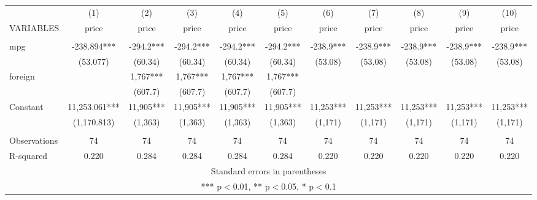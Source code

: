 \documentclass[]{article}
\begin{document}
\begin{tabular}{lcccccccccc} \hline
 & (1) & (2) & (3) & (4) & (5) & (6) & (7) & (8) & (9) & (10) \\
VARIABLES & price & price & price & price & price & price & price & price & price & price \\ \hline
 &  &  &  &  &  &  &  &  &  &  \\
mpg & -238.894*** & -294.2*** & -294.2*** & -294.2*** & -294.2*** & -238.9*** & -238.9*** & -238.9*** & -238.9*** & -238.9*** \\
 & (53.077) & (60.34) & (60.34) & (60.34) & (60.34) & (53.08) & (53.08) & (53.08) & (53.08) & (53.08) \\
foreign &  & 1,767*** & 1,767*** & 1,767*** & 1,767*** &  &  &  &  &  \\
 &  & (607.7) & (607.7) & (607.7) & (607.7) &  &  &  &  &  \\
Constant & 11,253.061*** & 11,905*** & 11,905*** & 11,905*** & 11,905*** & 11,253*** & 11,253*** & 11,253*** & 11,253*** & 11,253*** \\
 & (1,170.813) & (1,363) & (1,363) & (1,363) & (1,363) & (1,171) & (1,171) & (1,171) & (1,171) & (1,171) \\
 &  &  &  &  &  &  &  &  &  &  \\
Observations & 74 & 74 & 74 & 74 & 74 & 74 & 74 & 74 & 74 & 74 \\
 R-squared & 0.220 & 0.284 & 0.284 & 0.284 & 0.284 & 0.220 & 0.220 & 0.220 & 0.220 & 0.220 \\ \hline
\multicolumn{11}{c}{ Standard errors in parentheses} \\
\multicolumn{11}{c}{ *** p$<$0.01, ** p$<$0.05, * p$<$0.1} \\
\end{tabular}
\end{document}
